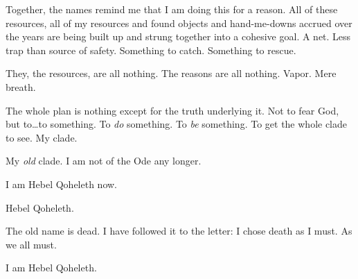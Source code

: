 Together, the names remind me that I am doing this for a reason. All of these resources, all of my resources and found objects and hand-me-downs accrued over the years are being built up and strung together into a cohesive goal. A net. Less trap than source of safety. Something to catch. Something to rescue.

They, the resources, are all nothing. The reasons are all nothing. Vapor. Mere breath.

The whole plan is nothing except for the truth underlying it. Not to fear God, but to\ldots{}to something. To \emph{do} something. To \emph{be} something. To get the whole clade to see. My clade.

My \emph{old} clade. I am not of the Ode any longer.

I am Hebel Qoheleth now.

Hebel Qoheleth.

The old name is dead. I have followed it to the letter: I chose death as I must. As we all must.

I am Hebel Qoheleth.
